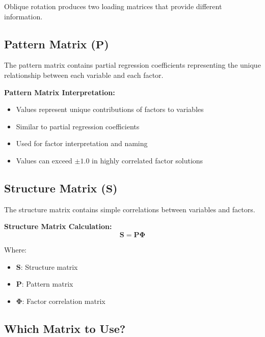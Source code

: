 \documentclass[a4paper]{tufte-book}
\begin{document}
Oblique rotation produces two loading matrices that provide different information.

\subsection{Pattern Matrix ($\mathbf{P}$)}

The pattern matrix contains partial regression coefficients representing the unique relationship between each variable and each factor.

\begin{mathconcept}
\textbf{Pattern Matrix Interpretation:}
\begin{itemize}
\item Values represent unique contributions of factors to variables
\item Similar to partial regression coefficients
\item Used for factor interpretation and naming
\item Values can exceed $\pm 1.0$ in highly correlated factor solutions
\end{itemize}
\end{mathconcept}

\subsection{Structure Matrix ($\mathbf{S}$)}

The structure matrix contains simple correlations between variables and factors.

\begin{mathconcept}
\textbf{Structure Matrix Calculation:}
$$\mathbf{S} = \mathbf{P}\boldsymbol{\Phi}$$

Where:
\begin{itemize}
\item $\mathbf{S}$: Structure matrix
\item $\mathbf{P}$: Pattern matrix  
\item $\boldsymbol{\Phi}$: Factor correlation matrix
\end{itemize}
\end{mathconcept}

\subsection{Which Matrix to Use?}
\end{document}
